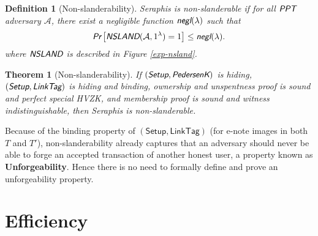 \documentclass{article}
\newtheorem{definition}{Definition}[section]
\newtheorem{theorem}{Theorem}[section]
\begin{document}
\begin{definition}[Non-slanderability]
Seraphis is non-slanderable if for all $\emph{\textsf{PPT}}$ adversary $\mathcal{A}$, there exist a negligible function $\emph{\textsf{negl}}(\lambda)$ such that
\begin{align*}
\emph{\textsf{Pr}}
\left[
\emph{\textsf{NSLAND}}(\mathcal{A}, 1^{\lambda})=1
\right]
\le \emph{\textsf{negl}}(\lambda).
\end{align*}
where $\emph{\textsf{NSLAND}}$ is described in Figure \ref{exp-nsland}.
\end{definition}
\begin{theorem}[Non-slanderability]\label{thm-nsland}
If $(\emph{\textsf{Setup}},\emph{\textsf{PedersenK}})$ is hiding, $(\emph{\textsf{Setup}},\emph{\textsf{LinkTag}})$ is hiding and binding, ownership and unspentness proof is sound and perfect special HVZK, and membership proof is sound and witness indistinguishable, then Seraphis is non-slanderable.
\end{theorem}
Because of the binding property of $(\textsf{Setup},\textsf{LinkTag})$ (for e-note images in both $T$ and $T'$), non-slanderability already captures that an adversary should never be able to forge an accepted transaction of another honest user, a property known as \textbf{Unforgeability}. Hence there is no need to formally define and prove an unforgeability property.


\section{Efficiency}




\appendix
\end{document}
